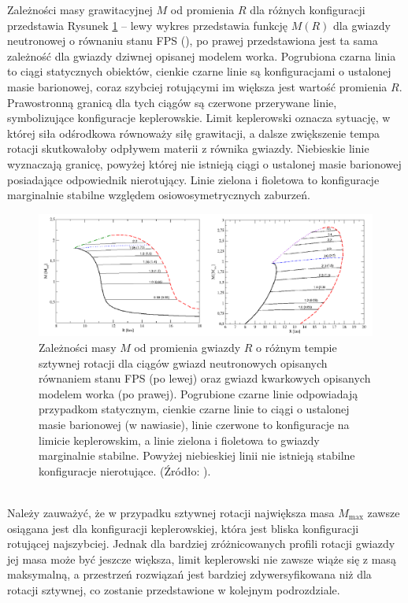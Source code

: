 \documentclass{bachelor_thesis}
\begin{document}
        \indent Zależności masy grawitacyjnej $M$ od promienia $R$ dla różnych konfiguracji przedstawia Rysunek \ref{RysMofR} -- lewy wykres przedstawia funkcję $M(R)$ dla gwiazdy neutronowej o równaniu stanu FPS (\citealp{Friedman1981}), po prawej przedstawiona jest ta sama zależność dla gwiazdy dziwnej opisanej modelem worka. Pogrubiona czarna linia to ciągi statycznych obiektów, cienkie czarne linie są konfiguracjami o ustalonej masie barionowej, coraz szybciej rotującymi im większa jest wartość promienia $R$. Prawostronną granicą dla tych ciągów są czerwone przerywane linie, symbolizujące konfiguracje keplerowskie. Limit keplerowski oznacza sytuację, w której siła odśrodkowa równoważy siłę grawitacji, a dalsze zwiększenie tempa rotacji skutkowałoby odpływem materii z równika gwiazdy. Niebieskie linie wyznaczają granicę, powyżej której nie istnieją ciągi o ustalonej masie barionowej posiadające odpowiednik nierotujący. Linie zielona i fioletowa to konfiguracje marginalnie stabilne względem osiowosymetrycznych zaburzeń.\\
        \begin{figure}[h!]
            \centering
            \includegraphics[scale=.28]{figures/RysMofR.png}
            \caption{Zależności masy $M$ od promienia gwiazdy $R$ o różnym tempie sztywnej rotacji dla ciągów gwiazd neutronowych opisanych równaniem stanu FPS (po lewej) oraz gwiazd kwarkowych opisanych modelem worka (po prawej). Pogrubione czarne linie odpowiadają przypadkom statycznym,  cienkie czarne linie to ciągi o ustalonej masie barionowej (w nawiasie), linie czerwone to konfiguracje na limicie keplerowskim, a linie zielona i fioletowa to gwiazdy marginalnie stabilne. Powyżej niebieskiej linii nie istnieją stabilne konfiguracje nierotujące. (Źródło: \citealp{Rosinska2007}).}
            \label{RysMofR}
        \end{figure}\\
        \indent Należy zauważyć, że w przypadku sztywnej rotacji największa masa $M_\textrm{max}$ zawsze osiągana jest dla konfiguracji keplerowskiej, która jest bliska konfiguracji rotującej najszybciej. Jednak dla bardziej zróżnicowanych profili rotacji gwiazdy jej masa może być jeszcze większa, limit keplerowski nie zawsze wiąże się z masą maksymalną, a przestrzeń rozwiązań jest bardziej zdywersyfikowana niż dla rotacji sztywnej, co zostanie przedstawione w kolejnym podrozdziale.
\end{document}
